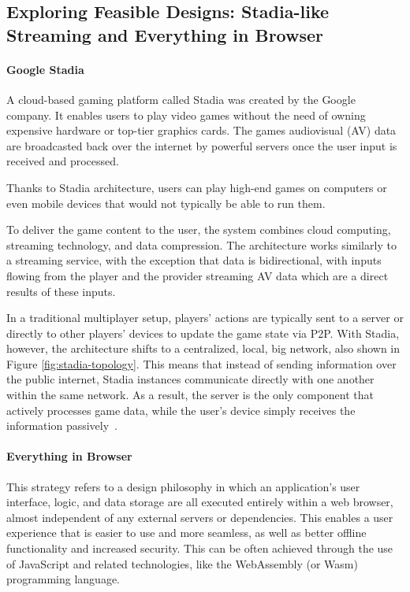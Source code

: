 \subsection{Exploring Feasible Designs: Stadia-like Streaming and Everything in Browser}
\label{ssec:exploring-feasible-designs-stadia-like-streaming-and-everything-in-browser}
\paragraph{Google Stadia} A cloud-based gaming platform called Stadia was created by the Google company. It enables users to play video games without the need of owning expensive hardware or top-tier graphics cards. The games audiovisual (AV) data are broadcasted back over the internet by powerful servers once the user input is received and processed.\newline


Thanks to Stadia architecture, users can play high-end games on computers or even mobile devices that would not typically be able to run them.\newline

To deliver the game content to the user, the system combines cloud computing, streaming technology, and data compression. The architecture works similarly to a streaming service, with the exception that data is bidirectional, with inputs flowing from the player and the provider streaming AV data which are a direct results of these inputs.\newline

In a traditional multiplayer setup, players' actions are typically sent to a server or directly to other players' devices to update the game state via P2P. With Stadia, however, the architecture shifts to a centralized, local, big network, also shown in Figure \ref{fig:stadia-topology}. This means that instead of sending information over the public internet, Stadia instances communicate directly with one another within the same network. As a result, the server is the only component that actively processes game data, while the user's device simply receives the information passively~\cite{AFirstLo55:online}.

\paragraph{Everything in Browser} This strategy refers to a design philosophy in which an application's user interface, logic, and data storage are all executed entirely within a web browser, almost independent of any external servers or dependencies. This enables a user experience that is easier to use and more seamless, as well as better offline functionality and increased security. This can be often achieved through the use of JavaScript and related technologies, like the WebAssembly (or Wasm) programming language.\newline

